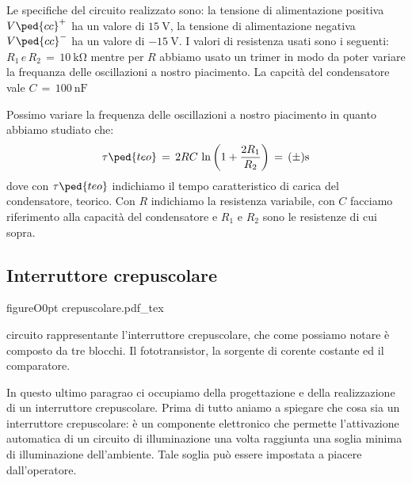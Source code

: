 Le specifiche del circuito realizzato sono: la tensione di alimentazione positiva $V\ped{cc}^+$ ha un valore di $\SI{+15}{\volt}$, la tensione di alimentazione negativa $V\ped{cc}^-$ ha un valore di $\SI{-15}{\volt}$. I valori di resistenza usati sono i seguenti: $R_1\,e\,R_2\,=\,\SI{10}{\kilo\ohm}$ mentre per $R$ abbiamo usato un trimer in modo da poter variare la frequanza delle oscillazioni a nostro piacimento. La capcità del condensatore vale $C\,=\,\SI{100}{\nano\farad}$

Possimo variare la frequenza delle oscillazioni a nostro piacimento in quanto abbiamo studiato che:
\begin{equation}
        \tau\ped{teo}\,=\,2RC\,\ln \left(1+\frac{2R_1}{R_2}\right)\,=\,(\pm)\SI{}{\second}  
\end{equation}
dove con $\tau\ped{teo}$ indichiamo il tempo caratteristico di carica del condensatore, teorico. Con $R$ indichiamo la resistenza variabile, con $C$ facciamo riferimento alla capacità del condensatore e $R_1$ e $R_2$ sono le resistenze di cui sopra.

\subsection*{Interruttore crepuscolare}

\begin{wrapfloat}{figure}{O}{0pt}
        \def\svgwidth{0.45\textwidth}
        {crepuscolare.pdf_tex}
        \caption{circuito rappresentante l'interruttore crepuscolare, che come possiamo notare è composto da tre blocchi. Il fototransistor, la sorgente di corente costante ed il comparatore.}
        \label{fig:interruttore}
\end{wrapfloat}

In questo ultimo paragrao ci occupiamo della progettazione e della realizzazione di un interruttore crepuscolare. Prima di tutto aniamo a spiegare che cosa sia un interruttore crepuscolare: è un componente elettronico che permette l'attivazione automatica di un circuito di illuminazione una volta raggiunta una soglia minima di illuminazione dell'ambiente. Tale soglia può essere impostata a piacere dall'operatore.

